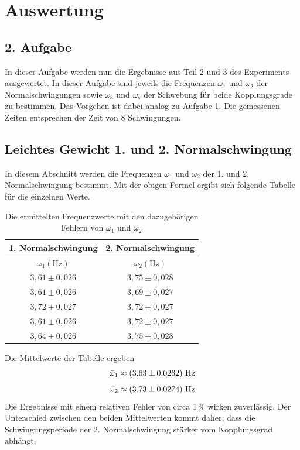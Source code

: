 \section{Auswertung}


\subsection{2. Aufgabe}
In dieser Aufgabe werden nun die Ergebnisse aus Teil 2 und 3 des Experiments ausgewertet. In dieser Aufgabe sind jeweils die Frequenzen $\omega_1$ und $\omega_2$ der Normalschwingungen sowie $\omega_3$ und $\omega_s$ der Schwebung für beide Kopplungsgrade zu bestimmen. Das Vorgehen ist dabei analog zu Aufgabe 1. Die gemessenen Zeiten entsprechen der Zeit von 8 Schwingungen. 

\subsection*{Leichtes Gewicht 1. und 2. Normalschwingung}
In diesem Abschnitt werden die Frequenzen $\omega_1$ und $\omega_2$ der 1. und 2. Normalschwingung bestimmt. Mit der obigen Formel ergibt sich folgende Tabelle für die einzelnen Werte. 
\begin{table}[H]
    \centering
    \begin{tabular}{c|c}
        1. Normalschwingung & 2. Normalschwingung \\
        \hline
        $\omega_1 \left(\text{Hz}\right)$ & $\omega_2 \left(\text{Hz}\right)$ \\
        \hline
        $3{,}61 \pm 0{,}026$ & $3{,}75 \pm 0{,}028$ \\
        $3{,}61 \pm 0{,}026$ & $3{,}69 \pm 0{,}027$ \\
        $3{,}72 \pm 0{,}027$ & $3{,}72 \pm 0{,}027$ \\
        $3{,}61 \pm 0{,}026$ & $3{,}72 \pm 0{,}027$ \\
        $3{,}64 \pm 0{,}026$ & $3{,}75 \pm 0{,}028$ \\
    \end{tabular}
    \caption{Die ermittelten Frequenzwerte mit den dazugehörigen Fehlern von $\omega_1$ und $\omega_2$}
\end{table}
Die Mittelwerte der Tabelle ergeben
\begin{equation*}
    \centering
    \bar{\omega}_1 \approx \left(3{,}63 \pm 0{,}0262 \right)\,\text{Hz}
\end{equation*}
\begin{equation*}
    \centering
    \bar{\omega}_2 \approx \left(3{,}73 \pm 0{,}0274 \right)\,\text{Hz}
\end{equation*}
Die Ergebnisse mit einem relativen Fehler von circa 1\,\% wirken zuverlässig. Der Unterschied zwischen den beiden Mittelwerten kommt daher, dass die Schwingungsperiode der 2. Normalschwingung stärker vom Kopplungsgrad abhängt.

